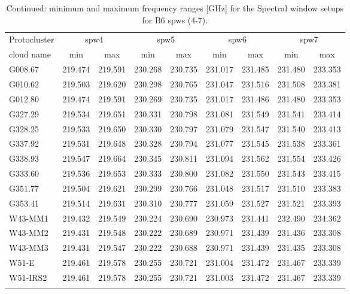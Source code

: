 \begin{table}[htbp!]
\ContinuedFloat
\centering
\caption{Continued: minimum and maximum frequency ranges [GHz] for the Spectral window setups for B6 spws (4-7).}
\begin{tabular}{@{\extracolsep{6pt}}lcccccccc@{}}
\hline \noalign {\smallskip}
Protocluster  & \multicolumn{2}{c}{spw4} & \multicolumn{2}{c}{spw5} & \multicolumn{2}{c}{spw6}& \multicolumn{2}{c}{spw7} \\ 
\cline{2-3}\cline{4-5}\cline{6-7}\cline{8-9}
  
cloud name\tnote{1}  & min & max  & min & max  & min & max  & min & max  \\
\hline \noalign {\smallskip}
G008.67 & 219.474&219.591&230.268&230.735&231.017&231.485&231.480&233.353 \\
G010.62 & 219.503&219.620&230.298&230.765&231.047&231.516&231.508&233.381 \\
G012.80 & 219.474&219.591&230.269&230.735&231.017&231.486&231.480&233.353 \\
G327.29 & 219.534&219.651&230.331&230.798&231.081&231.549&231.541&233.414 \\
G328.25 & 219.533&219.650&230.330&230.797&231.079&231.547&231.540&233.413 \\
G337.92 & 219.531&219.648&230.328&230.794&231.077&231.545&231.538&233.361 \\
G338.93 & 219.547&219.664&230.345&230.811&231.094&231.562&231.554&233.426 \\
G333.60 & 219.536&219.653&230.333&230.800&231.082&231.550&231.543&233.415 \\
G351.77 & 219.504&219.621&230.299&230.766&231.048&231.517&231.510&233.383 \\
G353.41 & 219.514&219.631&230.310&230.777&231.059&231.527&231.521&233.393 \\
W43-MM1 & 219.432&219.549&230.224&230.690&230.973&231.441&232.490&234.362 \\
W43-MM2 & 219.431&219.548&230.222&230.689&230.971&231.439&231.436&233.308 \\
W43-MM3 & 219.431&219.547&230.222&230.688&230.971&231.439&231.435&233.308 \\
W51-E & 219.461&219.578&230.255&230.721&231.004&231.472&231.467&233.339 \\
W51-IRS2 & 219.461&219.578&230.255&230.721&231.003&231.472&231.467&233.339 \\
\hline \noalign {\smallskip}
\end{tabular}
\end{table}